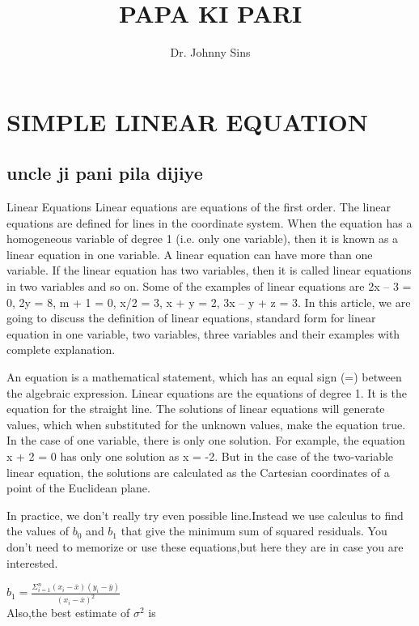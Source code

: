 \documentclass[14pt,a4paper]{article}
\title{PAPA KI PARI}
\author{Dr. Johnny Sins}
\begin{document}
	\maketitle
	\section{SIMPLE LINEAR EQUATION}
	\subsection{uncle ji pani pila dijiye}
	Linear Equations
	Linear equations are equations of the first order. The linear equations are defined for lines in the coordinate system. When the equation has a homogeneous variable of degree 1 (i.e. only one variable), then it is known as a linear equation in one variable. A linear equation can have more than one variable. If the linear equation has two variables, then it is called linear equations in two variables and so on. Some of the examples of linear equations are 2x – 3 = 0, 2y = 8, m + 1 = 0, x/2 = 3, x + y = 2, 3x – y + z = 3. In this article, we are going to discuss the definition of linear equations, standard form for linear equation in one variable, two variables, three variables and their examples with complete explanation.
	
	An equation is a mathematical statement, which has an equal sign (=) between the algebraic expression. Linear equations are the equations of degree 1. It is the equation for the straight line. The solutions of linear equations will generate values, which when substituted for the unknown values, make the equation true. In the case of one variable, there is only one solution. For example, the equation x + 2 = 0 has only one solution as x = -2. But in the case of the two-variable linear equation, the solutions are calculated as the Cartesian coordinates of a point of the Euclidean plane.
	
	In practice, we don't really try even possible line.Instead we use calculus to find the values of $b_{0}$ and $b_{1}$ that give the minimum sum of squared residuals. You don't need to memorize or use these equations,but here they are in case you are interested.
	
	
         	$ b_{1}= \frac{\Sigma_{i=1}^{n} (x_{i}-\overline{x})(y_{i}-\overline{y})}{(x_{i}-\overline{x})^2}$\\
         	
     Also,the best estimate of $\sigma^2$ is \\
     
\end{document}

